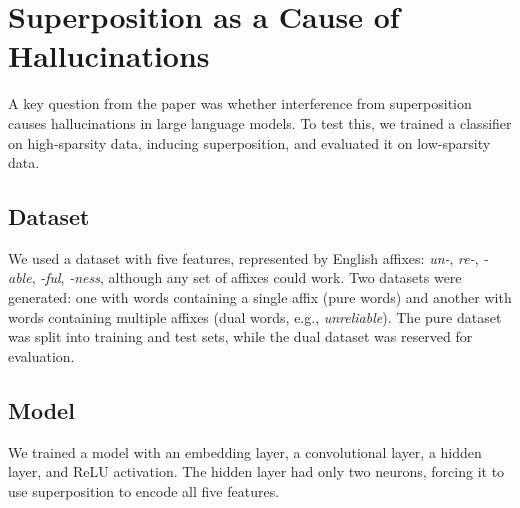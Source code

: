 \section{Superposition as a Cause of Hallucinations}
\label{sec:superposition_as_a_cause_of_hallucinations}

A key question from the paper was whether interference from superposition causes hallucinations in large language models.
To test this, we trained a classifier on high-sparsity data, inducing superposition, and evaluated it on low-sparsity data.

\subsection{Dataset}
We used a dataset with five features, represented by English affixes: \textit{un-}, \textit{re-}, \textit{-able}, \textit{-ful}, \textit{-ness}, although any set of affixes could work.
Two datasets were generated: one with words containing a single affix (pure words) and another with words containing multiple affixes (dual words, e.g., \textit{unreliable}).
The pure dataset was split into training and test sets, while the dual dataset was reserved for evaluation.

\subsection{Model}
We trained a model with an embedding layer, a convolutional layer, a hidden layer, and ReLU activation.
The hidden layer had only two neurons, forcing it to use superposition to encode all five features.

